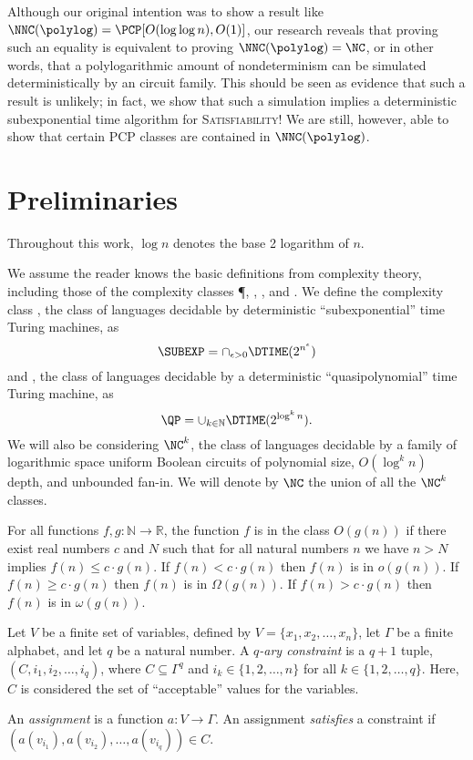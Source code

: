 \documentclass{article}
\newcommand{\loglog}{\log \log}
\begin{document}
Although our original intention was to show a result like $\NNC(\polylog) = \PCP[O(\loglog n), O(1)]$, our research reveals that proving such an equality is equivalent to proving $\NNC(\polylog) = \NC$, or in other words, that a polylogarithmic amount of nondeterminism can be simulated deterministically by an \NC{} circuit family.
This should be seen as evidence that such a result is unlikely; in fact, we show that such a simulation implies a deterministic subexponential time algorithm for \textsc{Satisfiability}!
We are still, however, able to show that certain PCP classes are contained in $\NNC(\polylog)$.

\section{Preliminaries}

Throughout this work, $\log n$ denotes the base 2 logarithm of $n$.

We assume the reader knows the basic definitions from complexity theory, including those of the complexity classes \P, \NP, \DTIME, and \DSPACE.
We define the complexity class \SUBEXP{}, the class of languages decidable by deterministic ``subexponential'' time Turing machines, as
\begin{equation*}
  \SUBEXP = \cap_{\epsilon > 0} \DTIME(2^{n^\epsilon})
\end{equation*}
and \QP{}, the class of languages decidable by a deterministic ``quasipolynomial'' time Turing machine, as
\begin{equation*}
  \QP = \cup_{k \in \mathbb{N}} \DTIME(2^{\log^k n}).
\end{equation*}
We will also be considering $\NC^k$, the class of languages decidable by a family of logarithmic space uniform Boolean circuits of polynomial size, $O(\log^k n)$ depth, and unbounded fan-in.
We will denote by $\NC$ the union of all the $\NC^k$ classes.

\begin{definition}
  For all functions $f, g \colon \mathbb{N} \to \mathbb{R}$, the function $f$ is in the class $O(g(n))$ if there exist real numbers $c$ and $N$ such that for all natural numbers $n$ we have $n > N$ implies $f(n) \leq c \cdot g(n)$.
  If $f(n) < c \cdot g(n)$ then $f(n)$ is in $o(g(n))$.
  If $f(n) \geq c \cdot g(n)$ then $f(n)$ is in $\Omega(g(n))$.
  If $f(n) > c \cdot g(n)$ then $f(n)$ is in $\omega(g(n))$.
\end{definition}

\begin{definition}
  Let $V$ be a finite set of variables, defined by $V = \{x_1, x_2, \dotsc, x_n\}$, let $\Gamma$ be a finite alphabet, and let $q$ be a natural number.
  A \emph{$q$-ary constraint} is a $q + 1$ tuple, $(C, i_1, i_2, \dotsc, i_q)$, where $C \subseteq \Gamma^q$ and $i_k \in \{1, 2, \dotsc, n\}$ for all $k \in \{1, 2, \ldots, q\}$.
  Here, $C$ is considered the set of ``acceptable'' values for the variables.

  An \emph{assignment} is a function $a \colon V \to \Gamma$.
  An assignment \emph{satisfies} a constraint if $(a(v_{i_1}), a(v_{i_2}), \dotsc, a(v_{i_q})) \in C$.
\end{definition}
\end{document}
